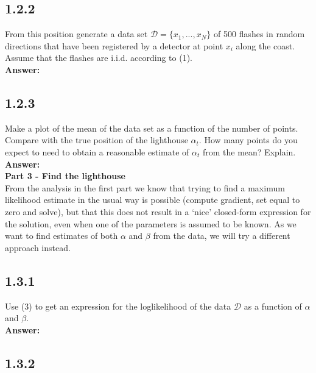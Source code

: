 \documentclass[a4paper]{article}
\begin{document}
\subsection*{1.2.2}

From this position generate a data set $\mathcal{D} = \{ x_1,..., x_N \}$ of 500 flashes in random directions that have been registered by a detector at point $x_i$ along the coast. Assume that the flashes are i.i.d. according to (1).\\

\textbf{Answer:}\\


\subsection*{1.2.3}

Make a plot of the mean of the data set as a function of the number of points. Compare with the true position of the lighthouse $\alpha_t$. How many points do you expect to need to obtain a reasonable estimate of $\alpha_t$ from the mean? Explain.\\

\textbf{Answer:}\\



\textbf{Part 3 - Find the lighthouse}\\

From the analysis in the first part we know that trying to find a maximum likelihood estimate in the usual way is possible (compute gradient, set equal to zero and solve), but that this does not result in a ‘nice’ closed-form expression for the solution, even when one of the parameters is assumed to be known. As we want to find estimates of both $\alpha$ and $\beta$ from the data, we will try a different approach instead.

\subsection*{1.3.1}

Use (3) to get an expression for the loglikelihood of the data $\mathcal{D}$ as a function of $\alpha$ and $\beta$.\\

\textbf{Answer:}\\


\subsection*{1.3.2}
\end{document}
